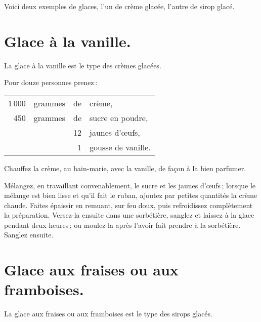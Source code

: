 \medskip

Voici deux exemples de glaces, l’un de crème glacée, l'autre de sirop glacé.

\section*{\centering Glace à la vanille.}
{}

La glace à la vanille est le type des crèmes glacées.

\medskip

Pour douze personnes prenez :

\footnotesize
\begin{longtable}{rrrp{16em}}
  1 000 & grammes & de & crème,                                                                           \\
    450 & grammes & de & sucre en poudre,                                                                 \\
        &         & 12 & jaunes d'œufs,                                                                   \\
        &         &  1 & gousse de vanille.                                                               \\
\end{longtable}
\normalsize

Chauffez la crème, au bain-marie, avec la vanille, de façon à la bien parfumer.

Mélangez, en travaillant convenablement, le sucre et les jaunes d'œufs ;
lorsque le mélange est bien lisse et qu'il fait le ruban, ajoutez par petites
quantités la crème chaude. Faites épaissir en remuant, sur feu doux, puis
refroidissez complètement la préparation. Versez-la ensuite dans une
sorbétière, sanglez et laissez à la glace pendant deux heures ; ou moulez-la
après l'avoir fait prendre à la sorbétière. Sanglez ensuite.

\section*{\centering Glace aux fraises ou aux framboises.}
{}

La glace aux fraises ou aux framboises est le type des sirops glacés.

